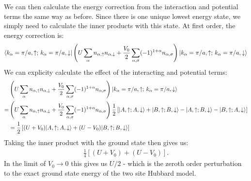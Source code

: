 \documentclass[12pt]{article}
\DeclarePairedDelimiter\bra{\langle}{\rvert} %
\DeclarePairedDelimiter\ket{\lvert}{\rangle}%
\numberwithin{equation}{section}
\begin{document}
We can then calculate the energy correction from the interaction and potential terms the same way as before. Since there is one unique lowest energy state, we simply need to calculate the inner products with this state. At first order, the energy correction is:
\begin{align}
    \bra{k_{\alpha}=\pi/a,\uparrow;\,k_{\alpha}=\pi/a,\downarrow}
    \left(U\sum_{\alpha}n_{\alpha,\uparrow}n_{\alpha,\downarrow}+\frac{V_0}{2}\sum_{\alpha,\sigma}(-1)^{1+\alpha}n_{\alpha,\sigma}\right)
    \ket{k_{\alpha}=\pi/a,\uparrow;\,k_{\alpha}=\pi/a,\downarrow}
\end{align}
We can explicity calculate the effect of the interacting and potential terms:
\begin{align}
    &\left(U\sum_{\alpha}n_{\alpha,\uparrow}n_{\alpha,\downarrow}+\frac{V_0}{2}\sum_{\alpha,\sigma}(-1)^{1+\alpha}n_{\alpha,\sigma}\right)
    \ket{k_{\alpha}=\pi/a,\uparrow;\,k_{\alpha}=\pi/a,\downarrow}\\
    =&\left(U\sum_{\alpha}n_{\alpha,\uparrow}n_{\alpha,\downarrow}+\frac{V_0}{2}\sum_{\alpha,\sigma}(-1)^{1+\alpha}n_{\alpha,\sigma}\right)
    \frac{1}{2}\left[\ket{A,\uparrow;A,\downarrow}+\ket{B,\uparrow;B,\downarrow}
    -\ket{A,\uparrow;B,\downarrow}-\ket{B,\uparrow;A,\downarrow}\right]\\
    &=\frac{1}{2}\left[(U+V_0)\ket{A,\uparrow;A,\downarrow}+(U-V_0)\ket{B,\uparrow;B,\downarrow}\right]
\end{align}
Taking the inner product with the ground state then gives us:
\begin{align}
    \frac{1}{4}\left[(U+V_0)+(U-V_0)\right].
\end{align}
In the limit of $V_0\to0$ this gives us $U/2$ - which is the zeroth order perturbation to the exact ground state energy of the two site Hubbard model. \\
\end{document}
